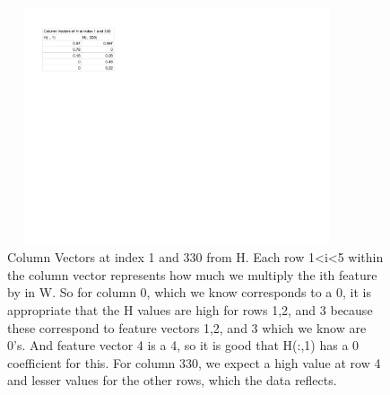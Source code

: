 \documentclass{article}
\begin{document}
\begin{figure}[H]
    \centerline
    {
    \includegraphics[width=10cm, height=7cm]{Q2_b_H_values}
    }
    \caption{\label{fig:my figure}  Column Vectors at index 1 and 330 from H.   Each row 1<i<5 within the column vector represents how much we multiply the ith feature by in W. So for column 0, which we know corresponds to a 0, it is appropriate that the H values are high for rows 1,2, and 3 because these correspond to feature vectors 1,2, and 3 which we know are 0's.  And feature vector 4 is a 4, so it is good that H(:,1) has a 0 coefficient for this.  For column 330, we expect a high value at row 4 and lesser values for the other rows, which the data reflects.   }
\end{figure}
\end{document}
